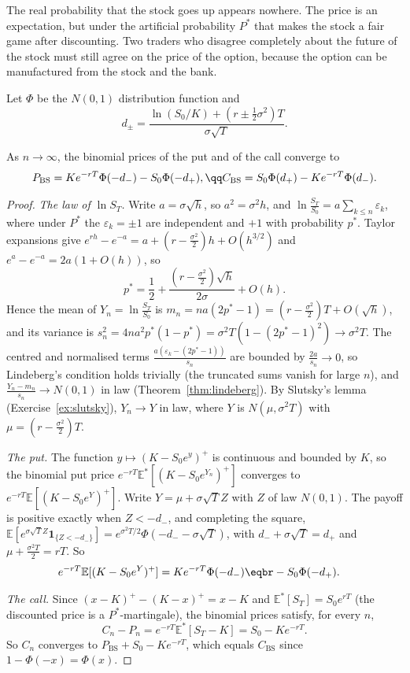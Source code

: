 \begin{beauty}
The real probability that the stock goes up appears nowhere. The price is an expectation, but under the artificial
probability $P^*$ that makes the stock a fair game after discounting. Two traders who disagree completely about the
future of the stock must still agree on the price of the option, because the option can be manufactured from the
stock and the bank.
\end{beauty}

Let $\Phi$ be the $N(0,1)$ distribution function and
\[
d_\pm=\frac{\ln(S_0/K)+(r\pm\frac12\sigma^2)T}{\sigma\sqrt T}.
\]

\begin{theorem}\label{thm:blackscholes}
As $n\to\infty$, the binomial prices of the put and of the call converge to
\[
\begin{gathered}P_{\mathrm{BS}}=Ke^{-rT}\Phi(-d_-)-S_0\Phi(-d_+),\qq C_{\mathrm{BS}}=S_0\Phi(d_+)-Ke^{-rT}\Phi(d_-).\end{gathered}
\]
\end{theorem}
\begin{proof}
\emph{The law of $\ln S_T$.} Write $a=\sigma\sqrt h$, so $a^2=\sigma^2h$, and $\ln\frac{S_T}{S_0}=a\sum_{k\le n}\varepsilon_k$, where under $P^*$ the $\varepsilon_k=\pm1$ are independent and $+1$ with
probability $p^*$. Taylor expansions give $e^{rh}-e^{-a}=a+(r-\frac{\sigma^2}2)h+O(h^{3/2})$ and $e^a-e^{-a}=2a(1+O(h))$, so
\[
p^*=\frac12+\frac{(r-\frac{\sigma^2}2)\sqrt h}{2\sigma}+O(h).
\]
Hence the mean of $Y_n=\ln\frac{S_T}{S_0}$ is $m_n=na(2p^*-1)=(r-\frac{\sigma^2}2)T+O(\sqrt h)$, and its variance is $s_n^2=4na^2p^*(1-p^*)=\sigma^2T(1-(2p^*-1)^2)\to\sigma^2T$. The
centred and normalised terms $\frac{a(\varepsilon_k-(2p^*-1))}{s_n}$ are bounded by $\frac{2a}{s_n}\to0$, so Lindeberg's condition holds trivially (the truncated sums vanish for
large $n$), and $\frac{Y_n-m_n}{s_n}\to N(0,1)$ in law (Theorem~\ref{thm:lindeberg}). By Slutsky's lemma (Exercise~\ref{ex:slutsky}), $Y_n\to Y$ in law, where $Y$ is
$N(\mu,\sigma^2T)$ with $\mu=(r-\frac{\sigma^2}2)T$.

\emph{The put.} The function $y\mapsto(K-S_0e^y)^+$ is continuous and bounded by $K$, so the binomial put price $e^{-rT}\mathbb E^*[(K-S_0e^{Y_n})^+]$ converges to
$e^{-rT}\mathbb E[(K-S_0e^Y)^+]$. Write $Y=\mu+\sigma\sqrt TZ$ with $Z$ of law $N(0,1)$. The payoff is positive exactly when $Z<-d_-$, and completing the square,
$\mathbb E[e^{\sigma\sqrt TZ}\mathbf 1_{\{Z<-d_-\}}]=e^{\sigma^2T/2}\Phi(-d_--\sigma\sqrt T)$, with $d_-+\sigma\sqrt T=d_+$ and $\mu+\frac{\sigma^2T}2=rT$. So
\[
\begin{aligned}e^{-rT}\mathbb E[(K-S_0e^Y)^+]&=Ke^{-rT}\Phi(-d_-)\eqbr-S_0\Phi(-d_+).\end{aligned}
\]

\emph{The call.} Since $(x-K)^+-(K-x)^+=x-K$ and $\mathbb E^*[S_T]=S_0e^{rT}$ (the discounted price is a $P^*$-martingale), the binomial prices satisfy, for every $n$,
\[
C_n-P_n=e^{-rT}\mathbb E^*[S_T-K]=S_0-Ke^{-rT}.
\]
So $C_n$ converges to $P_{\mathrm{BS}}+S_0-Ke^{-rT}$, which equals $C_{\mathrm{BS}}$ since $1-\Phi(-x)=\Phi(x)$.
\end{proof}

